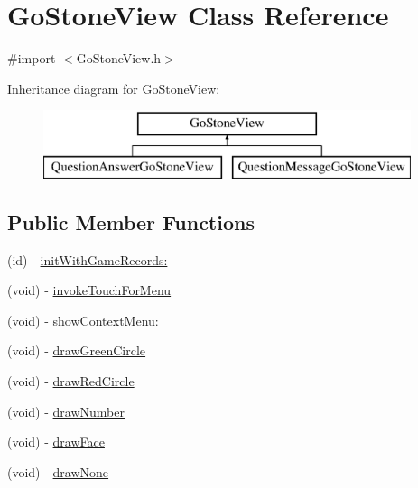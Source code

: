 \hypertarget{interface_go_stone_view}{
\section{GoStoneView Class Reference}
\label{interface_go_stone_view}
}


{\ttfamily \#import $<$GoStoneView.h$>$}

Inheritance diagram for GoStoneView:\begin{figure}[H]
\begin{center}
\leavevmode
\includegraphics[height=2.000000cm]{interface_go_stone_view}
\end{center}
\end{figure}
\subsection*{Public Member Functions}
\begin{DoxyCompactItemize}
\item 
(id) -\/ \hyperlink{interface_go_stone_view_a3946c2c5033f2d8056572b8d326208a4}{initWithGameRecords:}
\item 
(void) -\/ \hyperlink{interface_go_stone_view_a302beee4cd600bd1547d749dee7fbfc8}{invokeTouchForMenu}
\item 
(void) -\/ \hyperlink{interface_go_stone_view_a5646bd233b6cceee95798b5d0af515fa}{showContextMenu:}
\item 
(void) -\/ \hyperlink{interface_go_stone_view_a4c3a10f7dd4483c72de22ad0a3492c54}{drawGreenCircle}
\item 
(void) -\/ \hyperlink{interface_go_stone_view_af7fbdf3760540e2b6123ade6d07455d2}{drawRedCircle}
\item 
(void) -\/ \hyperlink{interface_go_stone_view_aa8b42d5f6fab4ff3b49eb16a59eaf1cd}{drawNumber}
\item 
(void) -\/ \hyperlink{interface_go_stone_view_a531d0e12d98d62763911164f2effcfb9}{drawFace}
\item 
(void) -\/ \hyperlink{interface_go_stone_view_a1c8c2fd0534f7ab8ae0769353ba36027}{drawNone}
\end{DoxyCompactItemize}
